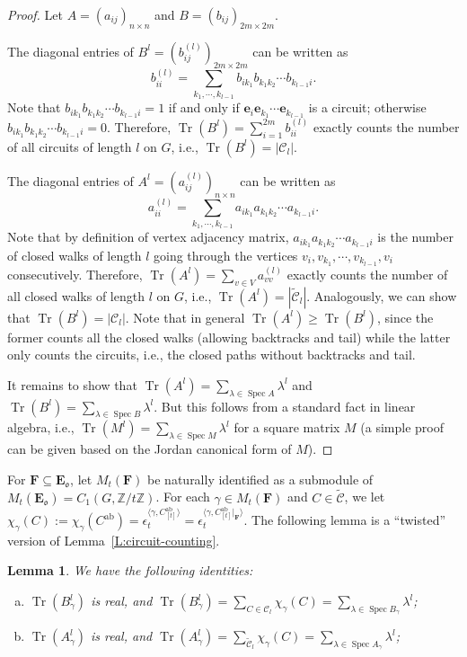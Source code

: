 \documentclass[11pt]{amsart}
\theoremstyle{plain}
\newtheorem{lemma}[theorem]{Lemma}
\theoremstyle{definition}
\newcommand{\mbbZ}{{\mathbb Z}}
\newcommand{\mcalC}{{\mathcal C}}
\newcommand{\mfrako}{{\mathfrak o}}
\newcommand{\ve}{{\mathbf e}}
\newcommand{\vE}{{\mathbf E}}
\newcommand{\vF}{{\mathbf F}}
\DeclareMathOperator{\spec}{\operatorname{Spec}}
\DeclareMathOperator{\ab}{\operatorname{ab}}
\DeclareMathOperator{\trace}{\operatorname{Tr}}
\numberwithin{equation}{section}
\begin{document}
\begin{proof}
Let $A=(a_{ij})_{n\times n}$ and $B=(b_{ij})_{2m\times 2m}$. 

The diagonal entries of $B^l=(b^{(l)}_{ij})_{2m\times 2m}$ can be written as $$b^{(l)}_{ii}=\sum_{k_1,\cdots,k_{l-1}}b_{ik_1}b_{k_1k_2}\cdots b_{k_{l-1}i}.$$  Note that $b_{ik_1}b_{k_1k_2}\cdots b_{k_{l-1}i}=1$ if and only if $\ve_i\ve_{k_1}\cdots\ve_{k_{l-1}}$ is a circuit; otherwise $b_{ik_1}b_{k_1k_2}\cdots b_{k_{l-1}i}=0$. Therefore, $\trace\left(B^l\right)=\sum_{i=1}^{2m}b^{(l)}_{ii}$ exactly counts the number of all circuits of length $l$ on $G$, i.e., $\trace\left(B^l\right) = |\mcalC_l|$.

The diagonal entries of  $A^l=(a^{(l)}_{ij})_{n\times n}$ can be written as $$a^{(l)}_{ii}=\sum_{k_1,\cdots,k_{l-1}}a_{ik_1}a_{k_1k_2}\cdots a_{k_{l-1}i}.$$
Note that by definition of vertex adjacency matrix, $a_{ik_1}a_{k_1k_2}\cdots a_{k_{l-1}i}$ is the number of closed walks of length $l$ going through the vertices $v_i,v_{k_1},\cdots,v_{k_{l-1}},v_i$ consecutively. Therefore, $\trace\left(A^l\right) = \sum_{v\in V}a^{(l)}_{vv}$ exactly counts the number of all closed walks of length $l$ on $G$, i.e., $\trace\left(A^l\right) = |\widetilde{\mcalC}_l|$. Analogously, we can show that $\trace\left(B^l\right) = |\mcalC_l|$. Note that in general $\trace\left(A^l\right) \geq \trace\left(B^l\right)$, since the former counts all the closed walks (allowing backtracks and tail) while the latter only counts the circuits, i.e., the closed paths without backtracks and tail. 

It remains to show that $\trace\left(A^l\right)=\sum_{\lambda\in \spec A}\lambda^l$ and $\trace\left(B^l\right)=\sum_{\lambda\in \spec B}\lambda^l$. But this follows from a standard fact in linear algebra, i.e., $\trace(M^l)=\sum_{\lambda\in \spec M}\lambda^l$ for a square matrix $M$ (a simple proof can be given based on the Jordan canonical form of $M$). 
\end{proof}



 For $\vF\subseteq \vE_\mfrako$, let $M_t(\vF)$ be naturally identified as a submodule of $M_t(\vE_\mfrako)=C_1(G,\mbbZ/t\mbbZ)$. For each $\gamma\in M_t(\vF)$ and $C\in\widetilde{\mcalC}$, we let $\chi_\gamma(C) :=\chi_\gamma(C^{\ab})=\epsilon_t^{\langle\gamma, C^{\ab}_{[t]}\rangle}=\epsilon_t^{\langle\gamma, C^{\ab}_{[t]}|_\vF\rangle}$. The following lemma is a ``twisted'' version of Lemma~\ref{L:circuit-counting}. 


\begin{lemma} \label{L:trace}
We have the following identities:
\begin{enumerate}[(a)]
\item $\trace\left(B_\gamma^l\right)$ is real, and $\trace\left(B_\gamma^l\right)=\sum_{C\in \mcalC_l}\chi_\gamma(C)=\sum_{\lambda\in \spec B_\gamma}\lambda^l$;
\item $\trace\left(A_\gamma^l\right)$ is real, and $\trace\left(A_\gamma^l\right)=\sum_{\widetilde{\mcalC}_l}\chi_\gamma(C)=\sum_{\lambda\in \spec A_\gamma}\lambda^l$;
\end{enumerate}
\end{lemma}
\end{document}
